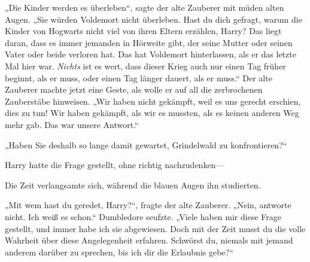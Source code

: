 „Die Kinder werden es überleben“, sagte der alte Zauberer mit müden alten Augen. „Sie würden Voldemort nicht überleben. Hast du dich gefragt, warum die Kinder von Hogwarts nicht viel von ihren Eltern erzählen, Harry? Das liegt daran, dass es immer jemanden in Hörweite gibt, der seine Mutter oder seinen Vater oder beide verloren hat. Das hat Voldemort hinterlassen, als er das letzte Mal hier war. \emph{Nichts} ist es wert, dass dieser Krieg auch nur einen Tag früher beginnt, als er muss, oder einen Tag länger dauert, als er muss.“ Der alte Zauberer machte jetzt eine Geste, als wolle er auf all die zerbrochenen Zauberstäbe hinweisen. „Wir haben nicht gekämpft, weil es uns gerecht erschien, dies zu tun! Wir haben gekämpft, als wir es mussten, als es keinen anderen Weg mehr gab. Das war unsere Antwort.“

„Haben Sie deshalb so lange damit gewartet, Grindelwald zu konfrontieren?“

Harry hatte die Frage gestellt, ohne richtig nachzudenken—

Die Zeit verlangsamte sich, während die blauen Augen ihn studierten.

„Mit wem hast du geredet, Harry?“, fragte der alte Zauberer. „Nein, antworte nicht. Ich weiß es schon.“ Dumbledore seufzte. „Viele haben mir diese Frage gestellt, und immer habe ich sie abgewiesen. Doch mit der Zeit musst du die volle Wahrheit über diese Angelegenheit erfahren. Schwörst du, niemals mit jemand anderem darüber zu sprechen, bis ich dir die Erlaubnis gebe?“

